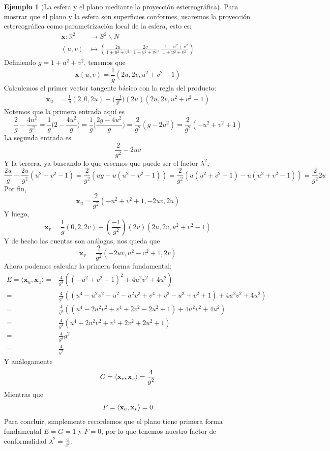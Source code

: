 \documentclass[spanish]{book}
\theoremstyle{definition}
\newtheorem*{ejem}{Ejemplo}
\begin{document}
\begin{ejem}[La esfera y el plano mediante la proyección estereográfica]
	Para mostrar que el plano y la esfera son superficies conformes, usaremos la proyección estereográfica como parametrización local de la esfera, esto es:
	\begin{align*}
		\mathbf{x}:\mathbb{R}^2&\to S^2\backslash{N}\\
		(u,v)&\mapsto \left(\frac{2u}{1+u^2+v^2},\frac{2v}{1+u^2+v^2},\frac{-1+u^2+v^2}{1+u^2+v^2}\right)
	\end{align*}
	Definiendo $g=1+u^2+v^2$, tenemos que 
	\[\mathbf{x}(u,v)=\frac{1}{g}(2u,2v,u^2+v^2-1)\]
	Calculemos el primer vector tangente básico con la regla del producto:
	\begin{align*}
		\mathbf{x}_u&=\frac{1}{g}(2,0,2u)+\Big(\frac{-1}{g^2}\Big)(2u)(2u,2v,u^2+v^2-1)
	\end{align*}
	Notemos que la primera entrada aquí es
	\[\frac{2}{g}-\frac{4u^2}{g^2}=\frac{1}{g}\Big(2-\frac{4u^2}{g}\Big)=\frac{1}{g}\Big(\frac{2g-4u^2}{g}\Big)=\frac{2}{g^2}(g-2u^2)=\frac{2}{g^2}(-u^2+v^2+1)\]
	La segunda entrada es 
	\[\frac{2}{g^2}-2uv\]
	Y la tercera, ya buscando lo que creemos que puede ser el factor $\lambda^2$,
	\[\frac{2u}{g}-\frac{2u}{g^2}(u^2+v^2-1)=\frac{2}{g^2}\left(ug-u(u^2+v^2-1)\right)=\frac{2}{g^2}\left(u(u^2+v^2+1)-u(u^2+v^2-1)\right)=\frac{2}{g^2}2u\]
	Por fin,
	\[\mathbf{x}_u=\frac{2}{g^2}(-u^2+v^2+1,-2uv,2u)\]
	Y luego,
	\[\mathbf{x}_v=\frac{1}{g}(0,2,2v)+\left(\frac{-1}{g^2}\right)(2v)(2u,2v,u^2+v^2-1)\]
	Y de hecho las cuentas son análogas, nos queda que
	\[\mathbf{x}_v=\frac{2}{g^2}(-2uv,u^2-v^2+1,2v)\]
	Ahora podemos calcular la primera forma fundamental:
	\begin{align*}
		E=\langle\mathbf{x}_u,\mathbf{x}_u\rangle=&\frac{4}{g^4}\left((-u^2+v^2+1)^2+4u^2v^2+4u^2\right)\\
		=&\frac{4}{g^4}\left((u^4-u^2v^2-u^2-u^2v^2+v^4+v^2-u^2+v^2+1)+4u^2v^2+4u^2\right)\\
		=&\frac{4}{g^4}\left((u^4-2u^2v^2+v^4+2v^2-2u^2+1)+4u^2v^2+4u^2\right)\\
		=&\frac{4}{g^4}\left(u^4+2u^2v^2+v^4+2v^2+2u^2+1\right)\\
		=&\frac{4}{g^4}g^2\\
		=&\frac{4}{g^2}
	\end{align*}
	Y análogamente
	\[G=\langle\mathbf{x}_v,\mathbf{x}_v\rangle=\frac{4}{g^2}\\\]
	Mientras que
	\[F=\langle\mathbf{x}_u,\mathbf{x}_v\rangle=0\\\]
	Para concluir, simplemente recordemos que el plano tiene primera forma fundamental $E=G=1$ y $F=0$, por lo que tenemos nuestro factor de conformalidad $\lambda^2=\frac{4}{g^2}$.
	

\end{ejem}
\end{document}
